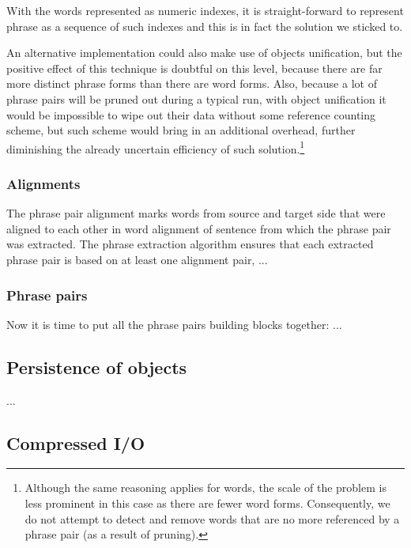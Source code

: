 With the words represented as numeric indexes, it is straight-forward to represent phrase as
a sequence of such indexes and this is in fact the solution we sticked to.

An alternative implementation could also make use of objects unification, but the positive
effect of this technique is doubtful on this level, because there are far more distinct
phrase forms than there are word forms.
Also, because a lot of phrase pairs will be pruned out during a typical \eppex{} run,
with object unification it would be impossible to wipe out their data without some reference
counting scheme, but such scheme would bring in an additional overhead, further diminishing
the already uncertain efficiency of such solution.\footnote{Although the same reasoning applies
for words, the scale of the problem is less prominent in this case as there are fewer word forms.
Consequently, we do not attempt to detect and remove words that are no more referenced by
a phrase pair (as a result of pruning).}

\subsubsection*{Alignments}

The phrase pair alignment marks words from source and target side that were aligned to
each other in word alignment of sentence from which the phrase pair was extracted.
The phrase extraction algorithm ensures that each extracted phrase pair is based on
at least one alignment pair, ...


\subsubsection*{Phrase pairs}

Now it is time to put all the phrase pairs building blocks together: ...

\subsection{Persistence of objects}

... %


\subsection{Compressed I/O}

